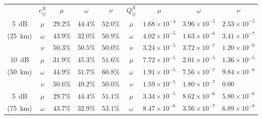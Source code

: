 \vspace*{\fill}

\begin{table}[p]
\centering
\begin{tabular}{cclllclll}
        & $e^X_{ij}$ & \multicolumn{1}{c}{$\mu$} & \multicolumn{1}{c}{$\omega$} & \multicolumn{1}{c}{$\nu$} & $Q^X_{ij}$ & \multicolumn{1}{c}{$\mu$} & \multicolumn{1}{c}{$\omega$} & \multicolumn{1}{c}{$\nu$} \vspace{5pt}\\
\SI{5}{dB}  & $\mu$        & $29.2\%$                  & $44.4\%$                  & $52.0\%$                  & $\mu$        & $1.68\times10^{-4}$     & $3.96\times10^{-5}$     & $2.53\times10^{-5}$     \\
(\SI{25}{\km}) & $\omega$        & $43.9\%$                  & $32.0\%$                  & $50.9\%$                  & $\omega$        & $4.02\times10^{-5}$     & $1.63\times10^{-6}$     & $3.41\times10^{-7}$     \\
        & $\nu$        & $50.3\%$                  & $50.5\%$                  & $50.0\%$                  & $\nu$        & $3.24\times10^{-5}$     & $3.72\times10^{-7}$     & $1.20\times10^{-9}$     \vspace{5pt}\\
        \SI{10}{dB}  & $\mu$        & $31.9\%$                  & $45.3\%$                  & $51.6\%$                  & $\mu$        & $7.72\times10^{-5}$     & $2.01\times10^{-5}$     & $1.36\times10^{-5}$     \\
(\SI{50}{\km}) & $\omega$        & $44.9\%$                  & $31.7\%$                  & $60.8\%$                  & $\omega$        & $1.91\times10^{-5}$     & $7.56\times10^{-7}$     & $9.84\times10^{-8}$\\
        & $\nu$        & $50.6\%$                  & $49.2\%$                  & $50.0\%$	 & $\nu$        & $1.59\times10^{-5}$     & $1.80\times10^{-7}$     & $0.00$     \vspace{5pt}\\
        \SI{5}{dB}  & $\mu$        & $29.7\%$                  & $44.4\%$                  & $51.1\%$                  & $\mu$        & $3.34\times10^{-5}$     & $8.62\times10^{-6}$     & $5.80\times10^{-6}$     \\
(\SI{75}{\km}) & $\omega$        & $43.7\%$                  & $32.9\%$                  & $53.1\%$                  & $\omega$        & $8.47\times10^{-6}$     & $3.56\times10^{-7}$     & $6.89\times10^{-8}$\\

\end{tabular}
\end{table}
